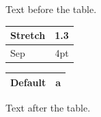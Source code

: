 \documentclass{article}
\begin{document}
Text before the table.

{\renewcommand{\arraystretch}{1.3}\setlength{\tabcolsep}{4pt}\begin{tabular}{|l|r|}\hline Stretch & 1.3\\\hline Sep & 4pt\\\hline\end{tabular}} \begin{tabular}{|l|r|}\hline Default & a\\\hline\end{tabular}

Text after the table.
\end{document}
